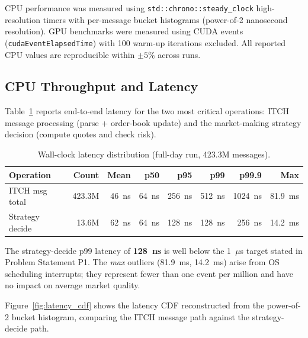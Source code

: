 \documentclass[12pt]{article}
\begin{document}
CPU performance was measured using \texttt{std::chrono::steady\_clock}
high-resolution timers with per-message bucket histograms (power-of-2
nanosecond resolution). GPU benchmarks were measured using CUDA events
(\texttt{cudaEventElapsedTime}) with 100 warm-up iterations excluded.
All reported CPU values are reproducible within $\pm5\%$ across runs.

\subsection{CPU Throughput and Latency}
\label{sec:eval:cpu}

Table~\ref{tab:latency} reports end-to-end latency for the two most
critical operations: ITCH message processing (parse + order-book update)
and the market-making strategy decision (compute quotes and check risk).

\begin{table}[H]
\centering
\small
\caption{Wall-clock latency distribution (full-day run, 423.3M messages).}
\label{tab:latency}
\begin{tabular}{@{}lrrrrrrr@{}}
\toprule
\textbf{Operation} & \textbf{Count} & \textbf{Mean} & \textbf{p50} & \textbf{p95} & \textbf{p99} & \textbf{p99.9} & \textbf{Max} \\
\midrule
ITCH msg total   & 423.3M & 46~ns & 64~ns & 256~ns & 512~ns & 1024~ns & 81.9~ms \\
Strategy decide  &  13.6M & 62~ns & 64~ns & 128~ns & 128~ns &  256~ns & 14.2~ms \\
\bottomrule
\end{tabular}
\end{table}

The strategy-decide p99 latency of \textbf{128~ns} is well below the
1~$\mu$s target stated in Problem Statement P1. The \textit{max} outliers
(81.9~ms, 14.2~ms) arise from OS scheduling interrupts; they represent
fewer than one event per million and have no impact on average market
quality.

Figure~\ref{fig:latency_cdf} shows the latency CDF reconstructed from
the power-of-2 bucket histogram, comparing the ITCH message path
against the strategy-decide path.
\end{document}
